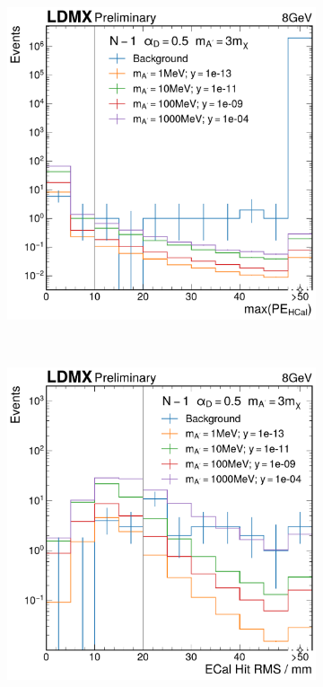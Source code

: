 \begin{figure}
\begin{subfigure}{0.48\textwidth}
    \end{subfigure}
    \\
    \begin{subfigure}{0.48\textwidth}
      \includegraphics[width=\textwidth]{figures/ldmx/analysis/nm1-hcal-max-pe-8gev-1e13norm.pdf}
    \end{subfigure}
    ~
    \begin{subfigure}{0.48\textwidth}
      \includegraphics[width=\textwidth]{figures/ldmx/analysis/nm1-ecal-rms-8gev-1e13norm.pdf}

\end{subfigure}
\end{figure}
